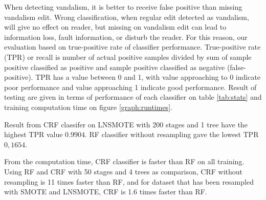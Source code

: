 When detecting vandalism, it is better to receive false positive than missing
vandalism edit.
Wrong classification, when regular edit detected as vandalism, will give no
effect on reader, but missing on vandalism edit can lead to information loss,
fault information, or disturb the reader.
For this reason, our evaluation based on true-positive rate of classifier
performance.
True-positive rate (TPR) or recall is number of actual positive samples divided
by sum of sample positive classified as positive and sample positive classified
as negative (false-positive).
TPR has a value between 0 and 1, with value approaching to 0 indicate poor
performance and value approaching 1 indicate good performance.
Result of testing are given in terms of performance of each classifier on table
\ref{tab:stats} and training computation time on figure \ref{graph:runtimes}.

Result from CRF classifer on LNSMOTE with 200 stages and 1 tree have the
highest TPR value $0.9904$.
RF classifier without resampling gave the lowest TPR $0,1654$.

From the computation time, CRF classifier is faster than RF on all training.
Using RF and CRF with 50 stages and 4 trees as comparison, CRF without
resampling is 11 times faster than RF, and for dataset that has been resampled
with SMOTE and LNSMOTE, CRF is 1.6 times faster than RF.

	

	
